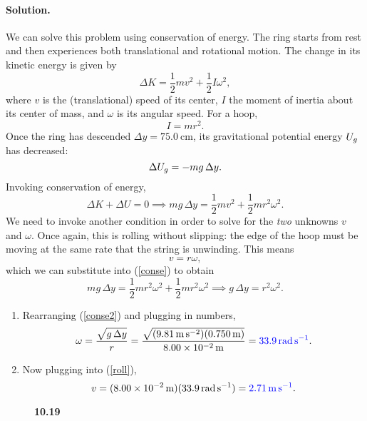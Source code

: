 \documentclass[11pt]{article}
\newcommand{\refeq}[1]{(\ref{#1})}
\newcommand{\beq}{\begin{equation*}}
\newcommand{\eeq}{\end{equation*}}
\newcommand{\beqn}{\begin{equation}}
\newcommand{\eeqn}{\end{equation}}
\newenvironment{solution}
{
    \paragraph{Solution.}
    \ignorespaces
}
{
    \bigskip
}
\begin{document}
\begin{solution}
	We can solve this problem using conservation of energy.  The ring starts from rest and then experiences both translational and rotational motion.  The change in its kinetic energy is given by
	\beq
		\Delta K = \frac{1}{2} m v^2 + \frac{1}{2} I \omega^2,
	\eeq
	where $v$ is the (translational) speed of its center, $I$ the moment of inertia about its center of mass, and $\omega$ is its angular speed.  For a hoop,
	\beq
		I = m r^2.
	\eeq
	Once the ring has descended $\Delta y = \SI{75.0}{\centi\meter}$, its gravitational potential energy $U_g$ has decreased:
	\beq
		\Delta \Ug = -mg \,\Delta y.
	\eeq
	Invoking conservation of energy,
	\beqn \label{conse}
		\Delta K + \Delta U = 0 \implies mg \,\Delta y = \frac{1}{2} m v^2 + \frac{1}{2} m r^2 \omega^2.
	\eeqn
	We need to invoke another condition in order to solve for the \emph{two} unknowns $v$ and $\omega$.  Once again, this is rolling without slipping: the edge of the hoop must be moving at the same rate that the string is unwinding.  This means
	\beqn \label{roll}
		v = r \omega,
	\eeqn
	which we can substitute into \refeq{conse} to obtain
	\beqn \label{conse2}
		mg \,\Delta y = \frac{1}{2} m r^2 \omega^2 + \frac{1}{2} m r^2 \omega^2 \implies g \,\Delta y = r^2 \omega^2.
	\eeqn
	
	\begin{enumerate}
		\item Rearranging \refeq{conse2} and plugging in numbers,
			\beq
				\omega = \frac{\sqrt{g \,\Delta y}}{r} = \frac{\sqrt{(\sig) (\SI{0.750}{\meter})}}{\SI{8.00e-2}{\meter}} = {\color{blue} \SI{33.9}{\radian\per\second}}.
			\eeq
			
		\item Now plugging into \refeq{roll},
			\beq
				v = (\SI{8.00e-2}{\meter}) (\SI{33.9}{\radian\per\second}) = {\color{blue} \SI{2.71}{\meter\per\second}}.
			\eeq
	\end{enumerate}
\end{solution}

\clearpage
\begin{figure}
	\vspace{1.5in}
	\caption{\textbf{10.19}}
	\label{10.19}
\end{figure}
\end{document}
